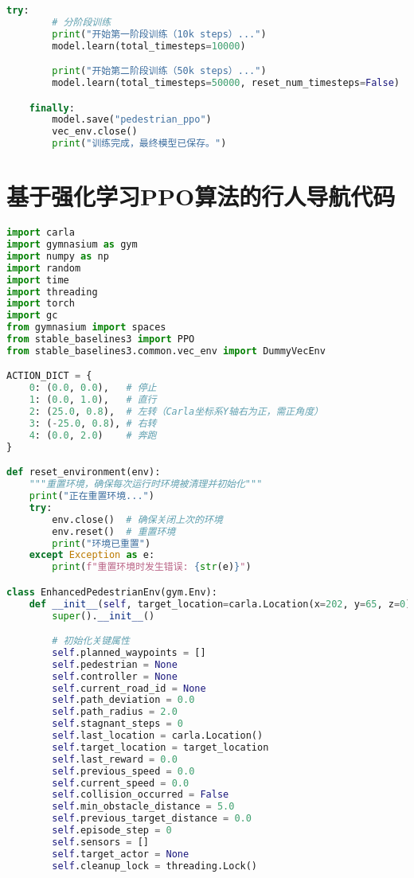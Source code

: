 \begin{lstlisting}[language=Python]
    try:
        # 分阶段训练
        print("开始第一阶段训练（10k steps）...")
        model.learn(total_timesteps=10000)

        print("开始第二阶段训练（50k steps）...")
        model.learn(total_timesteps=50000, reset_num_timesteps=False)

    finally:
        model.save("pedestrian_ppo")
        vec_env.close()
        print("训练完成，最终模型已保存。")
\end{lstlisting}

\section{基于强化学习PPO算法的行人导航代码}

\begin{lstlisting}[language=Python]
import carla
import gymnasium as gym
import numpy as np
import random
import time
import threading
import torch
import gc
from gymnasium import spaces
from stable_baselines3 import PPO
from stable_baselines3.common.vec_env import DummyVecEnv

ACTION_DICT = {
    0: (0.0, 0.0),   # 停止
    1: (0.0, 1.0),   # 直行
    2: (25.0, 0.8),  # 左转（Carla坐标系Y轴右为正，需正角度）
    3: (-25.0, 0.8), # 右转
    4: (0.0, 2.0)    # 奔跑
}

def reset_environment(env):
    """重置环境，确保每次运行时环境被清理并初始化"""
    print("正在重置环境...")
    try:
        env.close()  # 确保关闭上次的环境
        env.reset()  # 重置环境
        print("环境已重置")
    except Exception as e:
        print(f"重置环境时发生错误: {str(e)}")

class EnhancedPedestrianEnv(gym.Env):
    def __init__(self, target_location=carla.Location(x=202, y=65, z=0)):
        super().__init__()

        # 初始化关键属性
        self.planned_waypoints = []
        self.pedestrian = None
        self.controller = None
        self.current_road_id = None
        self.path_deviation = 0.0
        self.path_radius = 2.0
        self.stagnant_steps = 0
        self.last_location = carla.Location()
        self.target_location = target_location
        self.last_reward = 0.0
        self.previous_speed = 0.0
        self.current_speed = 0.0
        self.collision_occurred = False
        self.min_obstacle_distance = 5.0
        self.previous_target_distance = 0.0
        self.episode_step = 0
        self.sensors = []
        self.target_actor = None
        self.cleanup_lock = threading.Lock()


\end{lstlisting}
